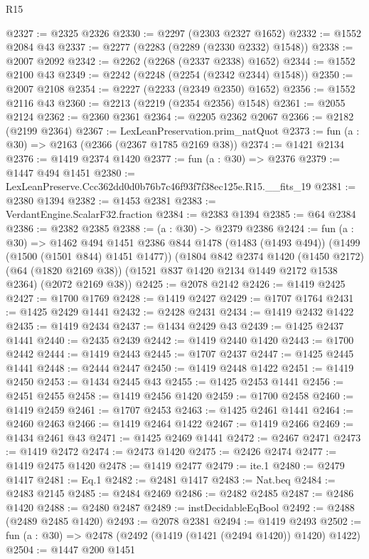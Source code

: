 \begin{lexlean}{R15}
\begin{coremodule}
@2327 := @2325 @2326
@2330 := @2297 (@2303 @2327 @1652)
@2332 := @1552 @2084 @43
@2337 := @2277 (@2283 (@2289 (@2330 @2332) @1548))
@2338 := @2007 @2092
@2342 := @2262 (@2268 (@2337 @2338) @1652)
@2344 := @1552 @2100 @43
@2349 := @2242 (@2248 (@2254 (@2342 @2344) @1548))
@2350 := @2007 @2108
@2354 := @2227 (@2233 (@2349 @2350) @1652)
@2356 := @1552 @2116 @43
@2360 := @2213 (@2219 (@2354 @2356) @1548)
@2361 := @2055 @2124
@2362 := @2360 @2361
@2364 := @2205 @2362 @2067
@2366 := @2182 (@2199 @2364)
@2367 := LexLeanPreservation.prim_natQuot
@2373 := fun (a : @30) => @2163 (@2366 (@2367 @1785 @2169 @38))
@2374 := @1421 @2134
@2376 := @1419 @2374 @1420
@2377 := fun (a : @30) => @2376
@2379 := @1447 @494 @1451
@2380 := LexLeanPreserve.Ccc362dd0d0b76b7c46f93f7f38ec125e.R15.__fits_19
@2381 := @2380 @1394
@2382 := @1453 @2381
@2383 := VerdantEngine.ScalarF32.fraction
@2384 := @2383 @1394
@2385 := @64 @2384
@2386 := @2382 @2385
@2388 := (a : @30) -> @2379 @2386
@2424 := fun (a : @30) =>
  @1462
    @494
    @1451
    @2386
    @844
    @1478
    (@1483 (@1493 @494))
    (@1499 (@1500 (@1501 @844) @1451 @1477))
    (@1804
      @842
      @2374
      @1420
      (@1450 @2172)
      (@64 (@1820 @2169 @38))
      (@1521 @837 @1420 @2134 @1449 @2172 @1538 @2364)
      (@2072 @2169 @38))
@2425 := @2078 @2142
@2426 := @1419 @2425
@2427 := @1700 @1769
@2428 := @1419 @2427
@2429 := @1707 @1764
@2431 := @1425 @2429 @1441
@2432 := @2428 @2431
@2434 := @1419 @2432 @1422
@2435 := @1419 @2434
@2437 := @1434 @2429 @43
@2439 := @1425 @2437 @1441
@2440 := @2435 @2439
@2442 := @1419 @2440 @1420
@2443 := @1700 @2442
@2444 := @1419 @2443
@2445 := @1707 @2437
@2447 := @1425 @2445 @1441
@2448 := @2444 @2447
@2450 := @1419 @2448 @1422
@2451 := @1419 @2450
@2453 := @1434 @2445 @43
@2455 := @1425 @2453 @1441
@2456 := @2451 @2455
@2458 := @1419 @2456 @1420
@2459 := @1700 @2458
@2460 := @1419 @2459
@2461 := @1707 @2453
@2463 := @1425 @2461 @1441
@2464 := @2460 @2463
@2466 := @1419 @2464 @1422
@2467 := @1419 @2466
@2469 := @1434 @2461 @43
@2471 := @1425 @2469 @1441
@2472 := @2467 @2471
@2473 := @1419 @2472
@2474 := @2473 @1420
@2475 := @2426 @2474
@2477 := @1419 @2475 @1420
@2478 := @1419 @2477
@2479 := ite.{1}
@2480 := @2479 @1417
@2481 := Eq.{1}
@2482 := @2481 @1417
@2483 := Nat.beq
@2484 := @2483 @2145
@2485 := @2484 @2469
@2486 := @2482 @2485
@2487 := @2486 @1420
@2488 := @2480 @2487
@2489 := instDecidableEqBool
@2492 := @2488 (@2489 @2485 @1420)
@2493 := @2078 @2381
@2494 := @1419 @2493
@2502 := fun (a : @30) => @2478 (@2492 (@1419 (@1421 (@2494 @1420)) @1420) @1422)
@2504 := @1447 @200 @1451

\end{coremodule}
\end{lexlean}
